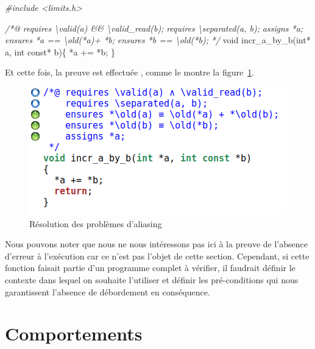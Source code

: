 \documentclass[12pt,francais,]{scrbook}
\newenvironment{Shaded}{}{}
\newcommand{\DataTypeTok}[1]{\textcolor[rgb]{0.56,0.13,0.00}{{#1}}}
\newcommand{\CommentTok}[1]{\textcolor[rgb]{0.38,0.63,0.69}{\textit{{#1}}}}
\newcommand{\NormalTok}[1]{{#1}}
\begin{document}
\begin{footnotesize}\begin{Shaded}
\begin{Highlighting}[]
\CommentTok{#include <limits.h>}

\CommentTok{/*@}
\CommentTok{  requires \textbackslash{}valid(a) && \textbackslash{}valid_read(b);}
\CommentTok{  requires \textbackslash{}separated(a, b);}
\CommentTok{  assigns  *a;}
\CommentTok{  ensures  *a == \textbackslash{}old(*a)+ *b;}
\CommentTok{  ensures  *b == \textbackslash{}old(*b);}
\CommentTok{*/}
\DataTypeTok{void} \NormalTok{incr_a_by_b(}\DataTypeTok{int}\NormalTok{* a, }\DataTypeTok{int} \DataTypeTok{const}\NormalTok{* b)\{}
  \NormalTok{*a += *b;}
\NormalTok{\}}
\end{Highlighting}
\end{Shaded}\end{footnotesize}

Et cette fois, la preuve est effectuée , comme le montre la
figure~\ref{fig:2-2-2-incr_a_by_b-2}.

\begin{figure}[htbp]
\centering
\includegraphics[scale=0.5]{2-2-2-incr_a_by_b-2.png}
\caption{Résolution des problèmes d'aliasing}
\label{fig:2-2-2-incr_a_by_b-2}
\end{figure}

Nous pouvons noter que nous ne nous intéressons pas ici à la preuve de
l'absence d'erreur à l'exécution car ce n'est pas l'objet de cette
section. Cependant, si cette fonction faisait partie d'un programme
complet à vérifier, il faudrait définir le contexte dans lequel on
souhaite l'utiliser et définir les pré-conditions qui nous garantissent
l'absence de débordement en conséquence.

\section{Comportements}\label{comportements}
\end{document}

